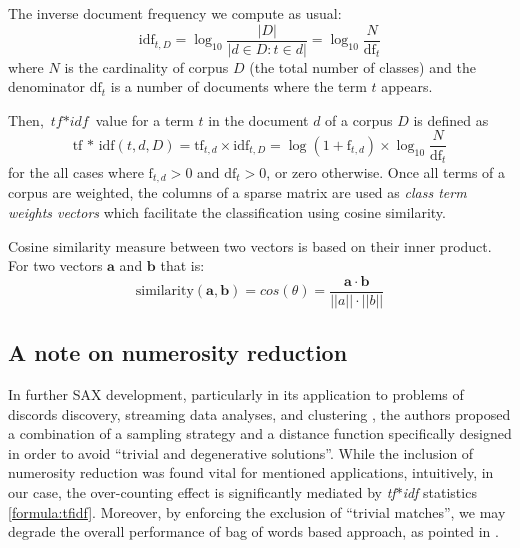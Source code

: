 \documentclass{llncs}
\begin{document}
The inverse document frequency we compute as usual:
\begin{equation}
 \mbox{idf}_{t, D} =  \log_{10}\frac{|D|}{|d \in D : t \in d|} = \log_{10}\frac{N}{\mbox{df}_{t}}
\end{equation} 
where $N$ is the cardinality of corpus $D$ (the total number of classes) and the 
denominator $\mbox{df}_{t}$ is a number of documents where the term $t$ appears.

Then, $\textit{tf$\ast$idf}$ value for a term $t$ in the document $d$ of a corpus $D$ is defined as 
\begin{equation}
 \mbox{tf * idf}(t, d, D) =  \mbox{tf}_{t, d} \times \mbox{idf}_{t, D} = \log(1 + \mbox{f}_{t,d})
\times \log_{10}\frac{N}{\mbox{df}_{t}}
 \label{formula:tfidf}
\end{equation} 
for the all cases where $\mbox{f}_{t,d}>0$ and $\mbox{df}_{t}>0$, or zero otherwise.
Once all terms of a corpus are weighted, the columns of a sparse matrix are used 
as \textit{class term weights vectors} which facilitate the classification using cosine similarity. 

\enlargethispage{0.5cm} 
Cosine similarity measure between two vectors is based on their inner product. 
For two vectors $\boldsymbol{a}$ and $\boldsymbol{b}$ that is:
\begin{equation}
\mbox{similarity}(\boldsymbol{a},\boldsymbol{b}) = cos(\theta) = \frac{ 
\mathbf{a} \cdot \mathbf{b} } {\left| \left| a \right| \right| \cdot \left| \left| b \right|
\right|}
\end{equation} 

\subsection{A note on numerosity reduction}
In further SAX development, particularly in its application to problems of discords discovery,
streaming data analyses, and clustering \cite{hot_sax, streaming_sax}, the authors 
proposed a combination of a sampling strategy and a distance function specifically 
designed in order to avoid ``trivial and degenerative solutions''. While the inclusion of
numerosity reduction was found vital for mentioned applications, intuitively, in our case, the
over-counting effect is significantly mediated by \textit{tf$\ast$idf}
statistics \eqref{formula:tfidf}. Moreover, by enforcing the exclusion of ``trivial matches'', we
may degrade the overall performance of bag of words based approach, as pointed
in \cite{bag_patterns}.
\end{document}
